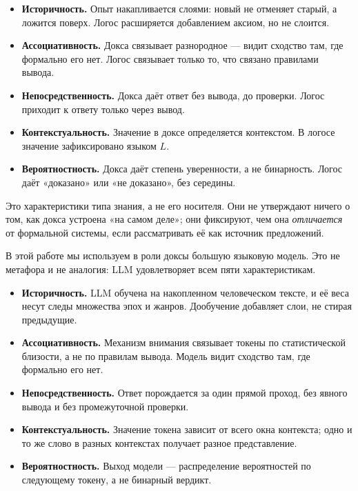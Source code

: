 \documentclass[12pt,a4paper]{article}
\begin{document}
\begin{itemize}
	\item \textbf{Историчность.} Опыт накапливается слоями: новый не отменяет старый,
	      а ложится поверх. Логос расширяется добавлением аксиом, но не слоится.
	\item \textbf{Ассоциативность.} Докса связывает разнородное --- видит сходство
	      там, где формально его нет. Логос связывает только то, что связано
	      правилами вывода.
	\item \textbf{Непосредственность.} Докса даёт ответ без вывода, до проверки.
	      Логос приходит к ответу только через вывод.
	\item \textbf{Контекстуальность.} Значение в доксе определяется контекстом.
	      В логосе значение зафиксировано языком $L$.
	\item \textbf{Вероятностность.} Докса даёт степень уверенности, а не бинарность.
	      Логос даёт «доказано» или «не доказано», без середины.
\end{itemize}

Это характеристики типа знания, а не его носителя. Они не утверждают ничего
о том, как докса устроена «на самом деле»; они фиксируют, чем она \emph{отличается}
от формальной системы, если рассматривать её как источник предложений.

В этой работе мы используем в роли доксы большую языковую модель. Это не метафора
и не аналогия: LLM удовлетворяет всем пяти характеристикам.

\begin{itemize}
	\item \textbf{Историчность.} LLM обучена на накопленном человеческом тексте, и её
	      веса несут следы множества эпох и жанров. Дообучение добавляет слои,
	      не стирая предыдущие.
	\item \textbf{Ассоциативность.} Механизм внимания связывает токены по
	      статистической близости, а не по правилам вывода. Модель видит сходство
	      там, где формально его нет.
	\item \textbf{Непосредственность.} Ответ порождается за один прямой проход,
	      без явного вывода и без промежуточной проверки.
	\item \textbf{Контекстуальность.} Значение токена зависит от всего окна
	      контекста; одно и то же слово в разных контекстах получает разное
	      представление.
	\item \textbf{Вероятностность.} Выход модели --- распределение вероятностей
	      по следующему токену, а не бинарный вердикт.
\end{itemize}
\end{document}
